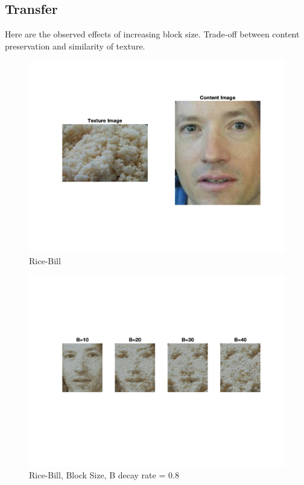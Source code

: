 \documentclass[10pt,twocolumn,letterpaper]{article}
\begin{document}
\subsection{Transfer}
Here are the observed effects of increasing block size. Trade-off between content preservation and similarity of texture.
\begin{figure}[h]
    \begin{center}
    \includegraphics[trim={2cm 4cm 2cm 2cm}, clip, scale=0.5]{../results/bsize/inp_rice_bill.png}
    \end{center}
    \vspace{-0.2em}
    \caption{Rice-Bill}
    \label{fig:rice_bill}
\end{figure}

\begin{figure}[h]
    \begin{center}
    \includegraphics[trim={2cm 6cm 2cm 4cm}, clip, scale=0.9]{../results/bsize/res_rice_bill_bdr_0_800000_iter_5.png}
    \end{center}
    \vspace{-0.2em}
    \caption{Rice-Bill, Block Size, B decay rate = 0.8}
    \label{fig:rice_bill_bs}
\end{figure}
\end{document}
